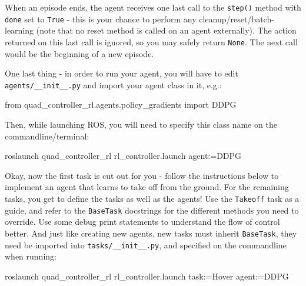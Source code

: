 \documentclass[11pt]{article}
\newenvironment{Shaded}{}{}
\newcommand{\NormalTok}[1]{{#1}}
\newcommand{\ImportTok}[1]{{#1}}
\newcommand{\ExtensionTok}[1]{{#1}}
\begin{document}
When an episode ends, the agent receives one last call to the
\texttt{step()} method with \texttt{done} set to \texttt{True} - this is
your chance to perform any cleanup/reset/batch-learning (note that no
reset method is called on an agent externally). The action returned on
this last call is ignored, so you may safely return \texttt{None}. The
next call would be the beginning of a new episode.

One last thing - in order to run your agent, you will have to edit
\texttt{agents/\_\_init\_\_.py} and import your agent class in it, e.g.:

\begin{Shaded}
\begin{Highlighting}[]
\ImportTok{from}\NormalTok{ quad_controller_rl.agents.policy_gradients }\ImportTok{import}\NormalTok{ DDPG}
\end{Highlighting}
\end{Shaded}

Then, while launching ROS, you will need to specify this class name on
the commandline/terminal:

\begin{Shaded}
\begin{Highlighting}[]
\ExtensionTok{roslaunch}\NormalTok{ quad_controller_rl rl_controller.launch agent:=DDPG}
\end{Highlighting}
\end{Shaded}

Okay, now the first task is cut out for you - follow the instructions
below to implement an agent that learns to take off from the ground. For
the remaining tasks, you get to define the tasks as well as the agents!
Use the \texttt{Takeoff} task as a guide, and refer to the
\texttt{BaseTask} docstrings for the different methods you need to
override. Use some debug print statements to understand the flow of
control better. And just like creating new agents, new tasks must
inherit \texttt{BaseTask}, they need be imported into
\texttt{tasks/\_\_init\_\_.py}, and specified on the commandline when
running:

\begin{Shaded}
\begin{Highlighting}[]
\ExtensionTok{roslaunch}\NormalTok{ quad_controller_rl rl_controller.launch task:=Hover agent:=DDPG}
\end{Highlighting}
\end{Shaded}
\end{document}
